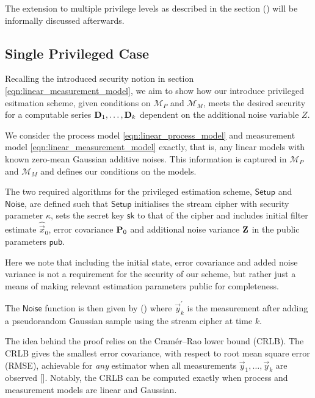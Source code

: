 \documentclass[conference]{IEEEtran}
\theoremstyle{definition}
\theoremstyle{definition}
\theoremstyle{remark}
\begin{document}
The extension to multiple privilege levels as described in the section () will be informally discussed afterwards.

% 
% 

\subsection{Single Privileged Case}
Recalling the introduced security notion in section \eqref{eqn:linear_measurement_model}, we aim to show how our introduce privileged esitmation scheme, given conditions on $\mathcal{M}_P$ and $\mathcal{M}_M$, meets the desired security for a computable series ${{\mathbf{D}}}_1,\dots,{{\mathbf{D}}}_k$ dependent on the additional noise variable $Z$.

We consider the process model \eqref{eqn:linear_process_model} and measurement model \eqref{eqn:linear_measurement_model} exactly, that is, any linear models with known zero-mean Gaussian additive noises. This information is captured in $\mathcal{M}_P$ and $\mathcal{M}_M$ and defines our conditions on the models.

The two required algorithms for the privileged estimation scheme, $\mathsf{Setup}$ and $\mathsf{Noise}$, are defined such that $\mathsf{Setup}$ initialises the stream cipher with security parameter $\kappa$, sets the secret key $\mathsf{sk}$ to that of the cipher and includes initial filter estimate $\hat{\vec{x}}_0$, error covariance ${{\mathbf{P}}}_0$ and additional noise variance ${{\mathbf{Z}}}$ in the public parameters $\mathsf{pub}$.

Here we note that including the initial state, error covariance and added noise variance is not a requirement for the security of our scheme, but rather just a means of making relevant estimation parameters public for completeness.

The $\mathsf{Noise}$ function is then given by () where $\vec{y}^\prime_k$ is the measurement after adding a pseudorandom Gaussian sample using the stream cipher at time $k$.

The idea behind the proof relies on the Cramér–Rao lower bound (CRLB). The CRLB gives the smallest error covariance, with respect to root mean square error (RMSE), achievable for \textit{any} estimator when all measurements $\vec{y}_1,\dots,\vec{y}_k$ are observed []. Notably, the CRLB can be computed exactly when process and measurement models are linear and Gaussian.
\end{document}
